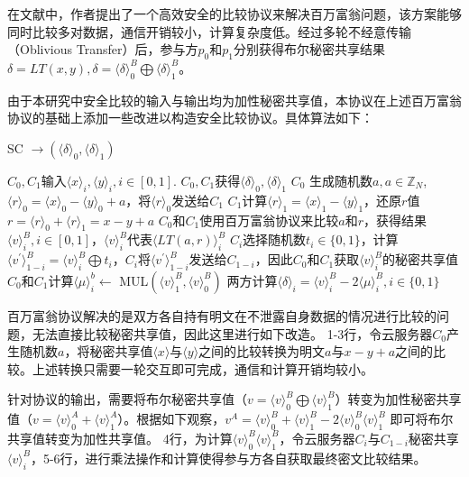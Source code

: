 在文献\cite{rathee2020cryptflow2}中，作者提出了一个高效安全的比较协议来解决百万富翁问题，该方案能够同时比较多对数据，通信开销较小，计算复杂度低。经过多轮不经意传输（Oblivious Transfer）后，参与方$p_0$和$p_1$分别获得布尔秘密共享结果$\delta = LT(x, y) ,\delta = \langle \delta \rangle^B_0 \bigoplus \langle \delta \rangle^B_1$。

由于本研究中安全比较的输入与输出均为加性秘密共享值，本协议在上述百万富翁协议的基础上添加一些改进以构造安全比较协议。具体算法如下：

\begin{algorithm}[htbp]
	\renewcommand{\algorithmicrequire}{\textbf{输入:}}
	\renewcommand{\algorithmicensure}{\textbf{输出:}}
	\caption{SC $\rightarrow (\langle \delta \rangle_0, \langle \delta \rangle_1)$}
	\label{alg_sc}
	\begin{algorithmic}[1]
		\REQUIRE $C_0,C_1$输入$\langle x \rangle_i, \langle y \rangle_i, i\in [0,1]$.
		\ENSURE $C_0,C_1$获得$\langle \delta\rangle_0, \langle \delta\rangle_1$
		\STATE $C_0$ 生成随机数$a, a\in \mathbb{Z}_N$, $\langle r \rangle_0=\langle x \rangle_0-\langle y\rangle_0+a$，将$\langle r \rangle_0$发送给$C_1$
		\STATE $C_1$计算$\langle r \rangle_1 = \langle x \rangle_1-\langle y\rangle_1$，还原$r$值$r=\langle r \rangle_0 + \langle r \rangle_1 = x-y+a$
		\STATE $C_0$和$C_1$使用百万富翁协议来比较$a$和$r$，获得结果$\langle v \rangle_i^B, i\in[0,1]$，$\langle v \rangle_i^B$代表$\langle LT(a,r)\rangle_i^B$
		\STATE $C_i$选择随机数$t_i \in \{0,1\}$，计算$\langle v^{'}\rangle_{1-i}^B=\langle v \rangle_i^B \bigoplus  t_i$，$C_i$将$\langle v^{'}\rangle_{1-i}^B$发送给$C_{1-i}$，因此$C_0$和$C_1$获取$\langle v \rangle_i^B$的秘密共享值
		\STATE $C_0$和$C_1$计算$\langle\mu \rangle_i^b \leftarrow$ MUL$(\langle v\rangle_1^B,\langle v\rangle_0^B)$
		\STATE 两方计算$ \langle \delta \rangle_i= \langle v \rangle_i^B -  2\langle\mu \rangle_i^B,i\in\{0, 1\}$

	\end{algorithmic}
\end{algorithm}

百万富翁协议解决的是双方各自持有明文在不泄露自身数据的情况进行比较的问题，无法直接比较秘密共享值，因此这里进行如下改造。
1-3行，令云服务器$C_0$产生随机数$a$，将秘密共享值$\langle x \rangle$与$\langle y\rangle$之间的比较转换为明文$a$与$x-y+a$之间的比较。上述转换只需要一轮交互即可完成，通信和计算开销均较小。

针对协议的输出，需要将布尔秘密共享值（$v=\langle v\rangle^B_0 \bigoplus \langle v\rangle^B_1$）转变为加性秘密共享值（$v=\langle v\rangle^A_0+\langle v \rangle^A_1$）。根据如下观察，$v^A=\langle v\rangle^B_0+\langle v\rangle^B_1 - 2\langle v\rangle^B_0 \langle v\rangle^B_1$ 即可将布尔共享值转变为加性共享值。
4行，为计算$\langle v\rangle^B_0 \langle v\rangle^B_1$，令云服务器$C_i$与$C_{1-i}$秘密共享$\langle v \rangle_i^B$，5-6行，进行乘法操作和计算使得参与方各自获取最终密文比较结果。


